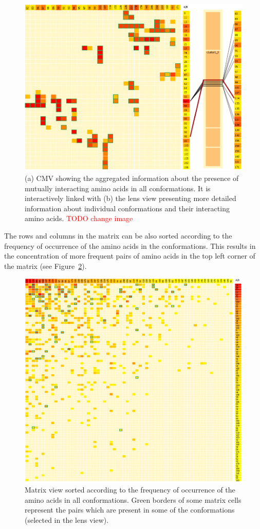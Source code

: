\documentclass[journal]{vgtc}                %
\begin{document}
\begin{figure}[bt]
  \centering
  \includegraphics[width=1.0\columnwidth]{matrixlens.png}
  \caption{(a) CMV showing the aggregated information about the presence of mutually interacting amino acids in all conformations. It is interactively linked with (b) the lens view presenting more detailed information about individual conformations and their interacting amino acids. \textcolor{red}{TODO change image}}
  \label{fig:matrixlens}
\end{figure}

The rows and columns in the matrix can be also sorted according to the frequency of occurrence of the amino acids in the conformations. 
This results in the concentration of more frequent pairs of amino acids in the top left corner of the matrix (see Figure~\ref{fig:sort}).

\begin{figure}[bt]
  \centering
  \includegraphics[width=0.8\columnwidth]{sort.png}
  \caption{Matrix view sorted according to the frequency of occurrence of the amino acids in all conformations. Green borders of some matrix cells represent the pairs which are present in some of the conformations (selected in the lens view).}
  \label{fig:sort}
\end{figure}
\end{document}
